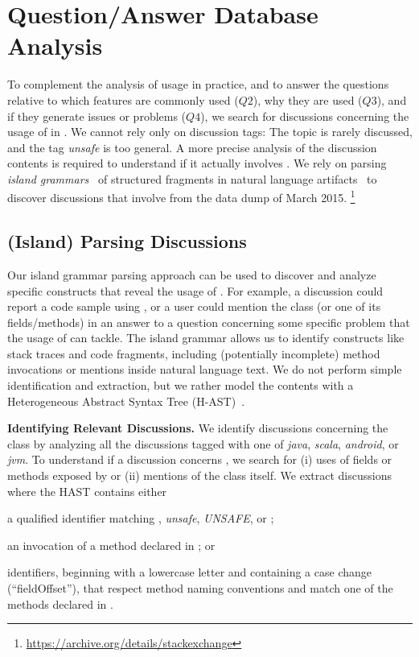 \section{Question/Answer Database Analysis}
\label{sec:unsafe:so}

To complement the analysis of \smu{} usage in practice,
and to answer the questions relative to which features are commonly used ($Q2$),
why they are used ($Q3$),
and if they generate issues or problems ($Q4$),
we search for discussions concerning the usage of \smu{} in \stackoverflow{}.
We cannot rely only on \stackoverflow{} discussion tags:
The topic is rarely discussed,
and the tag \emph{unsafe} is too general.
A more precise analysis of the discussion contents is required to understand if it actually involves \smu{}.
We rely on parsing \emph{island grammars}~\cite{Moon2001a} of structured fragments in natural language artifacts~\cite{Bacc2011f,Ponz2015a} to discover discussions that involve \smu{} from the \stackoverflow{} data dump of March 2015.%
\footnote{\url{https://archive.org/details/stackexchange}}

\subsection{(Island) Parsing \stackoverflow{} Discussions}

Our island grammar parsing approach can be used to discover and analyze specific constructs that reveal the usage of \smu{}.
For example, a discussion could report a code sample using \smu{},
or a user could mention the class (or one of its fields/methods) in an answer to a question concerning some specific problem that the usage of \smu{} can tackle.
The island grammar allows us to identify constructs like stack traces and \java{} code fragments,
including (potentially incomplete) method invocations or mentions inside natural language text.
We do not perform simple identification and extraction,
but we rather model the contents with a Heterogeneous Abstract Syntax Tree (H-AST)~\cite{Ponz2015a}.

\textbf{Identifying Relevant Discussions.}
We identify \stackoverflow{} discussions concerning the \smu{} class by analyzing all the discussions tagged with one of \emph{java}, \emph{scala}, \emph{android}, or \emph{jvm}.
To understand if a discussion concerns \smu{}, we search for
(i) uses of fields or methods exposed by \unsafe{} or
(ii) mentions of the class itself.
We extract discussions where the HAST contains either
\begin{inparaenum}[(i)]
\item a qualified identifier matching  \unsafe{}, \emph{unsafe}, \emph{UNSAFE}, or \smu{};
\item an invocation of a method declared in \smu; or
\item \java{} identifiers, beginning with a lowercase letter and containing a case change (\eg ``fieldOffset''), that respect method naming conventions and match one of the methods declared in \unsafe{}.
\end{inparaenum}

